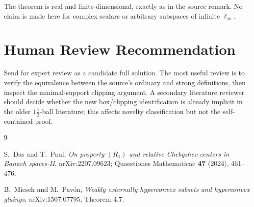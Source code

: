 \documentclass[11pt]{article}
\theoremstyle{definition}
\begin{document}
The theorem is real and finite-dimensional, exactly as in the source remark.
No claim is made here for complex scalars or arbitrary subspaces of infinite
\(\ell_\infty\).

\section{Human Review Recommendation}

Send for expert review as a candidate full solution.  The most useful review
is to verify the equivalence between the source's ordinary and strong
definitions, then inspect the minimal-support clipping argument.  A secondary
literature reviewer should decide whether the new box/clipping identification
is already implicit in the older \(1\tfrac{1}{2}\)-ball literature; this affects
novelty classification but not the self-contained proof.

\begin{thebibliography}{9}

S.~Das and T.~Paul,
\emph{On property-\((R_1)\) and relative Chebyshev centers in Banach
spaces-II},
arXiv:2207.09623; Quaestiones Mathematicae \textbf{47} (2024), 461--476.

B.~Miesch and M.~Pav\'on,
\emph{Weakly externally hyperconvex subsets and hyperconvex gluings},
arXiv:1507.07795, Theorem 4.7.

\end{thebibliography}
\end{document}
